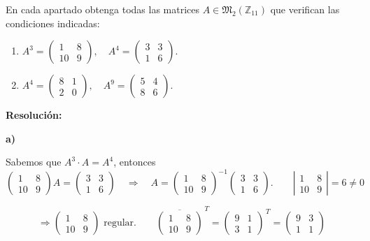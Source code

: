 \documentclass[a4paper,12pt]{article}
\begin{document}
\begin{ejercicio}[title=Ejercicio 22]
En cada apartado obtenga todas las matrices $A \in \mathfrak{M}_2(\mathbb{Z}_{11})$ que verifican las condiciones indicadas:

\begin{enumerate}
\item[a)] 
$A^3 =
\begin{pmatrix}
1 & 8\\
10 & 9
\end{pmatrix}, \quad
A^4 =
\begin{pmatrix}
3 & 3\\
1 & 6
\end{pmatrix}.$

\item[b)] 
$A^4 =
\begin{pmatrix}
8 & 1\\
2 & 0
\end{pmatrix}, \quad
A^9 =
\begin{pmatrix}
5 & 4\\
8 & 6
\end{pmatrix}.$
\end{enumerate}

\tcblower
\textbf{Resolución:}

\vspace{0.5em}

\textbf{a)}

Sabemos que $A^3 \cdot A = A^4$, entonces
\[
\begin{pmatrix}1 & 8\\ 10 & 9\end{pmatrix} A = \begin{pmatrix}3 & 3\\ 1 & 6\end{pmatrix} 
\quad \Rightarrow \quad 
A = \begin{pmatrix}1 & 8\\ 10 & 9\end{pmatrix}^{-1} \begin{pmatrix}3 & 3\\ 1 & 6\end{pmatrix}.
\qquad
\left|\begin{matrix}1 & 8\\ 10 & 9\end{matrix}\right| = 6 \ne 0
\]

\[
\Rightarrow
\begin{pmatrix}
    1 & 8\\ 10 & 9
\end{pmatrix}
\text{ regular.}
\qquad
\overline{\begin{pmatrix}1 & 8\\ 10 & 9\end{pmatrix}}^{\,T} =
\begin{pmatrix}9 & 1\\ 3 & 1\end{pmatrix}^{\,T} =
\begin{pmatrix}9 & 3\\ 1 & 1\end{pmatrix}
\]


\end{ejercicio}
\end{document}
